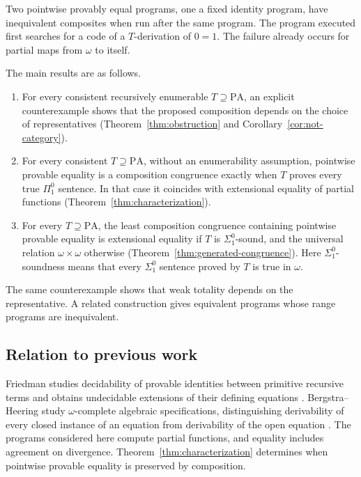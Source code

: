 \documentclass[11pt]{article}
\newcommand{\PA}{\mathrm{PA}}
\begin{document}
Two pointwise provably equal programs, one a fixed identity program,
have inequivalent composites when run after the same program.
The program executed first searches for a code of a $T$-derivation of $0=1$.
The failure already occurs for partial maps from $\omega$ to itself.

The main results are as follows.
\begin{enumerate}
\item For every consistent recursively enumerable $T\supseteq\PA$,
an explicit counterexample shows that the proposed composition depends
on the choice of representatives (Theorem~\ref{thm:obstruction} and
Corollary~\ref{cor:not-category}).
\item For every consistent $T\supseteq\PA$, without an enumerability
assumption, pointwise provable equality is a composition congruence
exactly when $T$ proves every true $\Pi^0_1$ sentence. In that case it
coincides with extensional equality of partial functions
(Theorem~\ref{thm:characterization}).
\item For every $T\supseteq\PA$, the least composition congruence
containing pointwise provable equality is extensional equality if $T$
is $\Sigma^0_1$-sound, and the universal relation $\omega\times\omega$
otherwise (Theorem~\ref{thm:generated-congruence}). Here $\Sigma^0_1$-soundness means
that every $\Sigma^0_1$ sentence proved by $T$ is true in $\omega$.
\end{enumerate}
The same counterexample shows that weak totality depends on the
representative. A related construction gives equivalent programs whose
range programs are inequivalent.

\subsection{Relation to previous work}

Friedman studies decidability of provable identities between
primitive recursive terms and obtains undecidable extensions of
their defining equations
\cite[Corollary~1, p.~382, and Theorem~3, p.~384]{Friedman}.
Bergstra--Heering study $\omega$-complete algebraic specifications,
distinguishing derivability of every closed instance of an equation
from derivability of the open equation
\cite[Sections~1.2--1.3, pp.~150--152]{BergstraHeering}.
The programs considered here compute partial functions, and equality
includes agreement on divergence. Theorem~\ref{thm:characterization}
determines when pointwise provable equality is preserved by composition.
\end{document}
